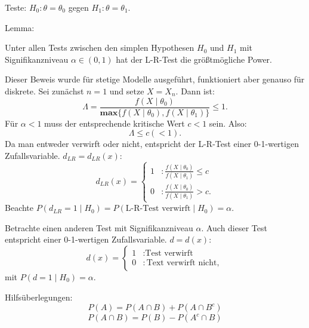 \documentclass[10pt]{article}
\newcommand{\eqname}[1]{\tag*{#1}}%
\newcommand{\dlr}{d_{LR}}%
\newenvironment{BWS}[1][]
{\begin{Beweis}[frametitle=#1]}{\end{Beweis}}
\begin{document}
	Teste: $H_0: \theta = \theta_0$ gegen $H_1: \theta = \theta_1.$
	
	Lemma:
	
	Unter allen Tests zwischen den simplen Hypothesen $H_0$ und $H_1$ mit Signifikanzniveau $\alpha \in (0,1)$ hat der L-R-Test die größtmögliche Power. 
	
	\begin{BWS}[Beweis 2.1.1 (NP-Lemma)]
		Dieser Beweis wurde für stetige Modelle ausgeführt, funktioniert aber genauso für diskrete. 
		Sei zunächst $n=1$ und setze $X = X_n$. 
		Dann ist:
		\begin{equation*}
			\Lambda = \frac{f(X\mid \theta_0)}{\textbf{max}\{f(X\mid \theta_0), f(X \mid \theta_1)\}} \leq 1.
		\end{equation*}
		Für $\alpha < 1$ muss der entsprechende kritische Wert  $c < 1$ sein. Also:
		\begin{equation*}
			\Lambda \leq c (< 1).
		\end{equation*}
		Da man entweder verwirft oder nicht, entspricht der L-R-Test einer 0-1-wertigen Zufallsvariable. $d_{LR} = d_{LR}(x)$:
		\begin{equation*}
			\dlr(x) = \begin{cases}
				1 &: \frac{f(X\mid \theta_0)}{f(X\mid \theta_1)} \leq c\\
				0 &: \frac{f(X\mid \theta_0)}{f(X\mid \theta_1)} > c.
			\end{cases}
		\end{equation*}
		Beachte $P(\dlr=1 \mid H_0) = P(\text{L-R-Test verwirft}\mid H_0) = \alpha$.
		
		Betrachte einen anderen Test mit Signifikanzniveau $\alpha$. Auch dieser Test entspricht einer 0-1-wertigen Zufallsvariable. $d = d(x)$:
		\begin{equation*}
			d(x)= \begin{cases}
				1 &: \text{Test verwirft}\\
				0 &: \text{Text verwirft nicht},
			\end{cases}
		\end{equation*}
		mit $P(d=1\mid H_0) = \alpha$.
		
		Hilfsüberlegungen:
		\begin{equation*}
			P(A) = P(A \cap B) + P(A \cap B^c) \eqname{(1)}
		\end{equation*}
		\begin{equation*}
			P(A \cap B) = P(B) - P(A^c \cap B) \eqname{(2)}
		\end{equation*}
		

\end{BWS}
\end{document}
